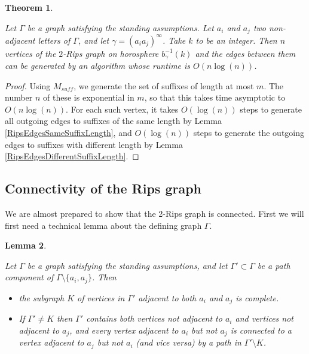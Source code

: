 \documentclass[10pt,a4paper]{amsart}
\newtheorem{theorem}{Theorem}[subsection]
\newtheorem{lemma}[theorem]{Lemma}
\theoremstyle{definition}
\theoremstyle{remark}
\begin{document}
	\begin{theorem} \label{RipsGraphGenerationSpeed}
		
		Let $\Gamma$ be a graph satisfying the standing assumptions. Let $a_i$ and $a_j$ two non-adjacent letters of $\Gamma$, and let $\gamma=(a_ia_j)^\infty$. Take $k$ to be an integer. Then $n$ vertices of the $2$-Rips graph on horosphere $b_\gamma^{-1}(k)$ and the edges between them can be generated by an algorithm whose runtime is $O(n\log(n))$.
		
	\end{theorem}
	
	\begin{proof}
		
		Using $M_{suff}$, we generate the set of suffixes of length at most $m$. The number $n$ of these is exponential in $m$, so that this takes time asymptotic to $O(n\log(n))$. For each such vertex, it takes $O(\log(n))$ steps to generate all outgoing edges to suffixes of the same length by Lemma \ref{RipsEdgesSameSuffixLength}, and $O(\log(n))$ steps to generate the outgoing edges to suffixes with different length by Lemma \ref{RipsEdgesDifferentSuffixLength}.
	\end{proof}
	
	
	\subsection{Connectivity of the Rips graph}
	\label{subsec:RipsConnectivity}
	
	We are almost prepared to show that the 2-Rips graph is connected. First we will first need a technical lemma about the defining graph $\Gamma$. 
	
	\begin{lemma} \label{RipsGraphTraversability}
		
		Let $\Gamma$ be a graph satisfying the standing assumptions, and let $\Gamma'\subset\Gamma$ be a path component of $\Gamma\setminus\{a_i, a_j\}$. Then
		
		\begin{itemize}
			\item the subgraph $K$ of vertices in $\Gamma'$ adjacent to both $a_i$ and $a_j$ is complete.
			
			\item If $\Gamma'\ne K$ then $\Gamma'$ contains both vertices not adjacent to $a_i$ and vertices not adjacent to $a_j$, and every vertex adjacent to $a_i$ but not $a_j$ is connected to a vertex adjacent to $a_j$ but not $a_i$ (and vice versa) by a path in $\Gamma'\setminus K$.
			
		\end{itemize}
		
	\end{lemma}
	
\end{document}
